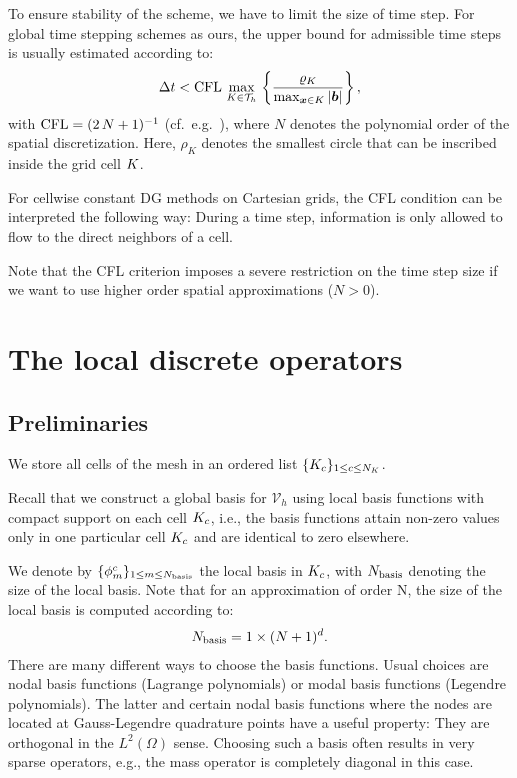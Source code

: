 \documentclass{scrreprt}
\begin{document}
To ensure stability of the scheme, we have to limit the size of time step.
For global time stepping schemes as ours, the upper bound for admissible time
steps is usually estimated according to:
\begin{align}
\label{eq:cfl_time_step}
\Delta
t <
\textup{CFL}\,\max_{K\in\mathcal{T}_h}\,\left\{
\frac{\varrho_K}{\max_{{\boldsymbol x}\in K}|{\boldsymbol b}|}
\right\},
\end{align}
with $\textup{CFL}=(2\,N+1)^{-1}$ (cf.~e.g.~\cite{cockburn_book}), where $N$
denotes the polynomial order of the spatial discretization.
Here, $\rho_K$ denotes the smallest circle that can be inscribed inside
the grid cell $K$.
\begin{remark}
{\rm
For cellwise constant DG methods on Cartesian grids, the CFL condition can be
interpreted the following way:
}
During a time step,
information is only allowed to flow to the direct neighbors of
a cell.
\end{remark}
\begin{remark}
{\rm
Note that the CFL criterion imposes a severe restriction on the
time step size if we want to use higher order spatial approximations
($N>0$).}
\end{remark}
\section{The local discrete operators}
\subsection{Preliminaries}
We store all cells of the mesh in an ordered list $\{
K_c \}_{1 \leq c \leq {N_{K}}}$.

Recall that we construct a global basis
for $\mathcal{V}_h$ using local basis
functions with compact support on each cell $K_c$, i.e., the basis functions
attain non-zero values only in one particular cell $K_c$ and are identical
to zero elsewhere.

We denote by $\{ \phi^{c}_{m} \}_{1 \leq m \leq
N_\textup{basis}}$ the local basis in $K_c$,
with $N_\textup{basis}$ denoting the size of the local basis.
Note that for an approximation of order N, the size of the local basis is
computed according to:
\begin{align}
N_\textup{basis} = 1\times(N+1)^d.
\end{align}
There are many different ways to choose the basis functions.
Usual choices are nodal basis functions (Lagrange polynomials) or
modal basis functions (Legendre polynomials).
The latter and certain nodal basis functions where the nodes are located at
Gauss-Legendre quadrature points have a useful property:
They are orthogonal in the $L^2(\Omega)$ sense.
Choosing such a basis often results in very sparse operators, e.g.,
the mass operator is completely diagonal in this case.
\end{document}
